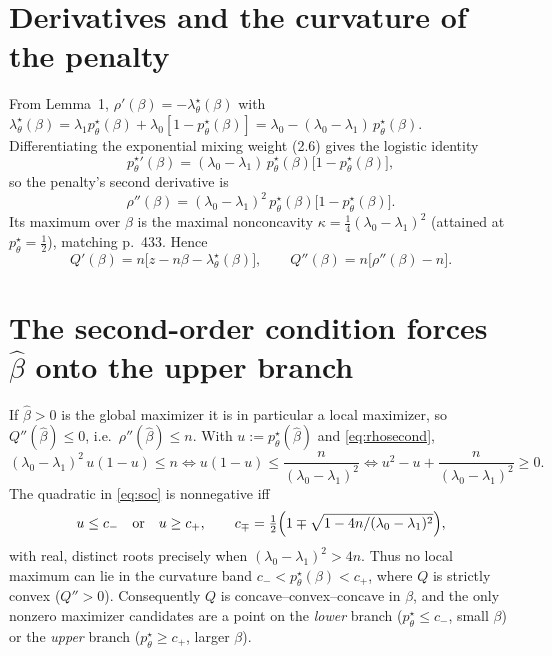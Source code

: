 \documentclass[11pt]{article}
\newcommand{\bhat}{\widehat{\beta}}
\newcommand{\pstar}{p^{\star}}
\newcommand{\lstar}{\lambda^{\star}}
\newcommand{\lamdiff}{(\lambda_0-\lambda_1)}
\begin{document}
\section{Derivatives and the curvature of the penalty}

From Lemma~1, $\rho'(\beta) = -\lstar_\theta(\beta)$ with
$\lstar_\theta(\beta) = \lambda_1\pstar_\theta(\beta) + \lambda_0[1-\pstar_\theta(\beta)]
= \lambda_0 - \lamdiff\,\pstar_\theta(\beta)$.
Differentiating the exponential mixing weight (2.6) gives the logistic identity
\begin{equation}\label{eq:pprime}
  \pstar_\theta{}'(\beta) = \lamdiff\,\pstar_\theta(\beta)\bigl[1-\pstar_\theta(\beta)\bigr],
\end{equation}
so the penalty's second derivative is
\begin{equation}\label{eq:rhosecond}
  \rho''(\beta) = \lamdiff^2\,\pstar_\theta(\beta)\bigl[1-\pstar_\theta(\beta)\bigr].
\end{equation}
Its maximum over $\beta$ is the maximal nonconcavity
$\kappa = \tfrac14\lamdiff^2$ (attained at $\pstar_\theta=\tfrac12$), matching
p.~433. Hence
\begin{equation}\label{eq:Qderiv}
  Q'(\beta) = n\bigl[z - n\beta - \lstar_\theta(\beta)\bigr],
  \qquad
  Q''(\beta) = n\bigl[\rho''(\beta) - n\bigr].
\end{equation}

\section{The second-order condition forces $\bhat$ onto the upper branch}

If $\bhat>0$ is the global maximizer it is in particular a local maximizer, so
$Q''(\bhat)\le 0$, i.e.\ $\rho''(\bhat)\le n$. With $u := \pstar_\theta(\bhat)$
and \eqref{eq:rhosecond},
\begin{equation}\label{eq:soc}
  \lamdiff^2\, u(1-u) \le n
  \iff
  u(1-u) \le \frac{n}{\lamdiff^2}
  \iff
  u^2 - u + \frac{n}{\lamdiff^2} \ge 0.
\end{equation}
The quadratic in \eqref{eq:soc} is nonnegative iff
\begin{equation}\label{eq:branches}
  u \le c_-
  \quad\text{or}\quad
  u \ge c_+,
  \qquad
  c_\mp = \tfrac{1}{2}\Bigl(1 \mp \sqrt{1-4n/\lamdiff^2}\Bigr),
\end{equation}
with real, distinct roots precisely when $\lamdiff^2 > 4n$. Thus no local
maximum can lie in the curvature band $c_- < \pstar_\theta(\beta) < c_+$, where
$Q$ is strictly convex ($Q''>0$). Consequently $Q$ is concave--convex--concave
in $\beta$, and the only nonzero maximizer candidates are a point on the
\emph{lower} branch ($\pstar_\theta \le c_-$, small $\beta$) or the \emph{upper}
branch ($\pstar_\theta \ge c_+$, larger $\beta$).
\end{document}
